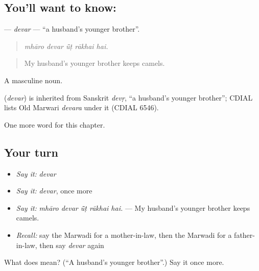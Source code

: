 \subsection*{You'll want to know: }
\textbf{} — \emph{devar} — \textquotedblleft{}a husband's younger brother\textquotedblright{}.

\begin{quote}
    
\end{quote}

\begin{quote}
\emph{mhāro devar ū̃ṭ rākhai hai.}
\end{quote}

\begin{quote}
My husband's younger brother keeps camels.
\end{quote}

A masculine noun.

\begin{cousinweb}
\textbf{} (\emph{devar}) is inherited from Sanskrit \emph{devṛ}, \textquotedblleft{}a husband's younger brother\textquotedblright{}; CDIAL lists Old Marwari \emph{devara} under it (CDIAL 6546).
\end{cousinweb}

\begin{grammarlens}[title={What you've built}]
One more word for this chapter.
\end{grammarlens}

\subsection*{Your turn}
\begin{itemize}
\raggedright
  \item \emph{Say it:} \emph{devar}
  \item \emph{Say it:} \emph{devar}, once more
  \item \emph{Say it:} \emph{mhāro devar ū̃ṭ rākhai hai.} — My husband's younger brother keeps camels.
  \item \emph{Recall:} say the Marwadi for a mother-in-law, then the Marwadi for a father-in-law, then say \emph{devar} again
\end{itemize}

\begin{tcolorbox}[breakable,colback=teal!4,colframe=teal!35!black,title={Before you move on}]
What does  mean? (\textquotedblleft{}A husband's younger brother\textquotedblright{}.) Say it once more.
\end{tcolorbox}
